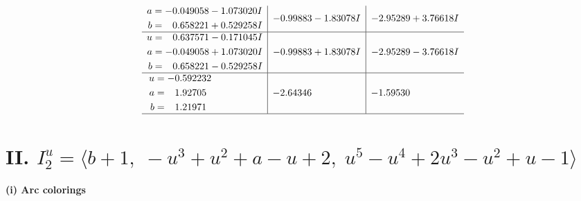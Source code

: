 \documentclass[1p]{elsarticle_modified}
\theoremstyle{definition}
\begin{document}
$$\begin{array}{c|c|c}
\begin{aligned}
a &= -0.049058 - 1.073020 I \\
b &= \phantom{-}0.658221 + 0.529258 I\end{aligned}
 & -0.99883 - 1.83078 I & -2.95289 + 3.76618 I \\ \hline\begin{aligned}
u &= \phantom{-}0.637571 - 0.171045 I \\
a &= -0.049058 + 1.073020 I \\
b &= \phantom{-}0.658221 - 0.529258 I\end{aligned}
 & -0.99883 + 1.83078 I & -2.95289 - 3.76618 I \\ \hline\begin{aligned}
u &= -0.592232\phantom{ +0.000000I} \\
a &= \phantom{-}1.92705\phantom{ +0.000000I} \\
b &= \phantom{-}1.21971\phantom{ +0.000000I}\end{aligned}
 & -2.64346\phantom{ +0.000000I} & -1.59530\phantom{ +0.000000I}\\
 \hline 
 \end{array}$$\newpage\newpage\renewcommand{\arraystretch}{1}
\centering \section*{II. $I^u_{2}= \langle b+1,\;- u^3+u^2+a- u+2,\;u^5- u^4+2 u^3- u^2+u-1 \rangle$}
\flushleft \textbf{(i) Arc colorings}\\
\end{document}
